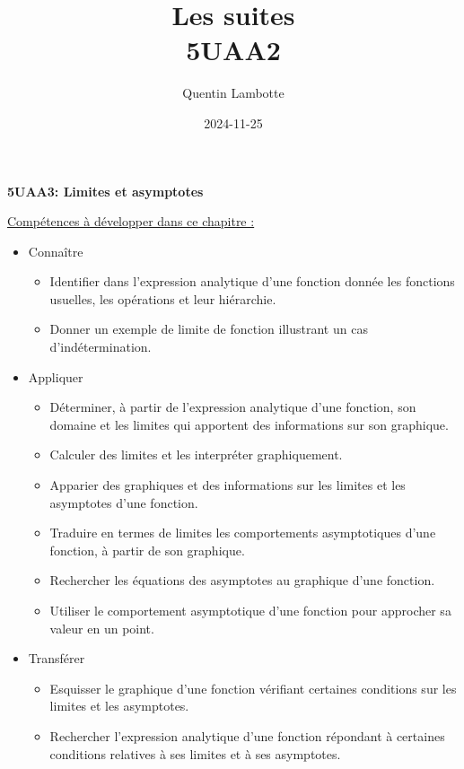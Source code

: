 \documentclass[a4paper,12pt]{report}
\author{Quentin Lambotte}
\date{2024-11-25}
\title{Les suites\\\medskip
\large 5UAA2}
\begin{document}
\begin{titlepage}
\begin{center}
\vspace{2cm}
\Huge
\textbf{5UAA3: Limites et asymptotes}
\vspace{2cm}

\end{center}

\vspace{1cm}
\singlespacing
\small
\uline{Compétences à développer dans ce chapitre :}
\begin{itemize}
\item Connaître
\begin{itemize}
\item Identifier dans l’expression analytique d’une fonction donnée les
fonctions usuelles, les opérations et leur hiérarchie.
\item Donner un exemple de limite de fonction illustrant un cas d'indétermination.
\end{itemize}
\item Appliquer
\begin{itemize}
\item Déterminer, à partir de l’expression analytique d’une fonction,
son domaine et les limites qui apportent des informations sur son
graphique.
\item Calculer des limites et les interpréter graphiquement.
\item Apparier des graphiques et des informations sur les limites et les
asymptotes d’une fonction.
\item Traduire en termes de limites les comportements asymptotiques
d’une fonction, à partir de son graphique.
\item Rechercher les équations des asymptotes au graphique d’une
fonction.
\item Utiliser le comportement asymptotique d’une fonction pour
approcher sa valeur en un point.
\end{itemize}
\item Transférer
\begin{itemize}
\item Esquisser le graphique d’une fonction vérifiant certaines
conditions sur les limites et les asymptotes.
\item Rechercher l’expression analytique d’une fonction répondant à
certaines conditions relatives à ses limites et à ses asymptotes.
\end{itemize}
\end{itemize}
\end{titlepage}
\onehalfspacing
\end{document}
